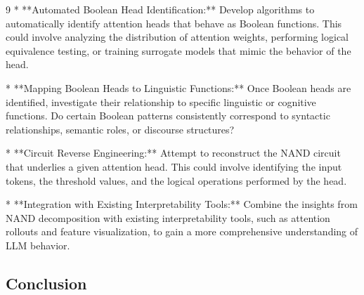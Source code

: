\documentclass[11pt]{article}
\theoremstyle{definition}
\begin{document}
\begin{thebibliography}{9}
*   **Automated Boolean Head Identification:** Develop algorithms to automatically identify attention heads that behave as Boolean functions. This could involve analyzing the distribution of attention weights, performing logical equivalence testing, or training surrogate models that mimic the behavior of the head.






*   **Mapping Boolean Heads to Linguistic Functions:** Once Boolean heads are identified, investigate their relationship to specific linguistic or cognitive functions. Do certain Boolean patterns consistently correspond to syntactic relationships, semantic roles, or discourse structures?






*   **Circuit Reverse Engineering:**  Attempt to reconstruct the NAND circuit that underlies a given attention head. This could involve identifying the input tokens, the threshold values, and the logical operations performed by the head.






*   **Integration with Existing Interpretability Tools:**  Combine the insights from NAND decomposition with existing interpretability tools, such as attention rollouts and feature visualization, to gain a more comprehensive understanding of LLM behavior.













\subsection{Conclusion}














\end{thebibliography}
\end{document}
